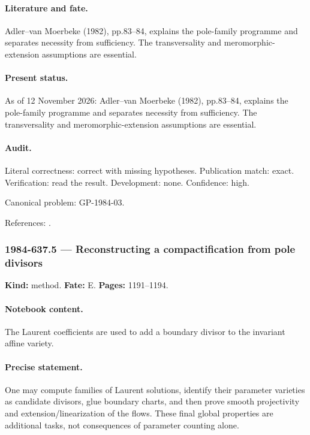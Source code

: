 \paragraph{Literature and fate.} Adler--van Moerbeke (1982), pp.83--84, explains the pole-family programme and separates necessity from sufficiency. The transversality and meromorphic-extension assumptions are essential.

\paragraph{Present status.} As of 12 November 2026: Adler--van Moerbeke (1982), pp.83--84, explains the pole-family programme and separates necessity from sufficiency. The transversality and meromorphic-extension assumptions are essential.

\paragraph{Audit.} Literal correctness: correct with missing hypotheses. Publication match: exact. Verification: read the result. Development: none. Confidence: high.

\noindent Canonical problem: GP-1984-03.\par

\noindent References: \citep{adler1982kowalewski}.\par

\subsubsection{1984-637.5 --- Reconstructing a compactification from pole divisors}

\label{item:1984-637.5}

\noindent\textbf{Kind:} method. \textbf{Fate:} E. \textbf{Pages:} 1191--1194.\par

\paragraph{Notebook content.} The Laurent coefficients are used to add a boundary divisor to the invariant affine variety.

\paragraph{Precise statement.} One may compute families of Laurent solutions, identify their parameter varieties as candidate divisors, glue boundary charts, and then prove smooth projectivity and extension/linearization of the flows. These final global properties are additional tasks, not consequences of parameter counting alone.

